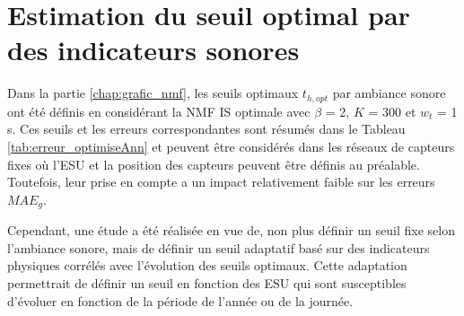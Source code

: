 \chapter{Estimation du seuil optimal par des indicateurs sonores}\label{annexe:optThreshold}

Dans la partie \ref{chap:grafic_nmf}, les seuils optimaux $t_{h,opt}$ par ambiance sonore ont été définis en considérant la NMF IS optimale avec $\beta$ = 2, $K$ = 300 et $w_t$ = 1 s. Ces seuils et les erreurs correspondantes  sont résumés dans le Tableau \ref{tab:erreur_optimiseAnn} et peuvent être considérés dans les réseaux de capteurs fixes où l'ESU et la position des capteurs peuvent être définis au préalable. Toutefois, leur prise en compte a un impact relativement faible sur les erreurs $MAE_g$. 

Cependant, une étude a été réalisée en vue de, non plus définir un seuil fixe selon l'ambiance sonore, mais de définir un seuil adaptatif basé sur des indicateurs physiques corrélés avec l'évolution des seuils optimaux. Cette adaptation permettrait de définir un seuil en fonction des ESU qui sont susceptibles d'évoluer en fonction de la période de l'année ou de la journée.

\begin{table}[h]
\centering
\caption{Erreurs $MAE_{60}$ minimales selon le seuil fixe $t_h$ et optimal $t_{h,opt}$ par ambiance sonore.}
\label{tab:erreur_optimiseAnn}
\end{table}


